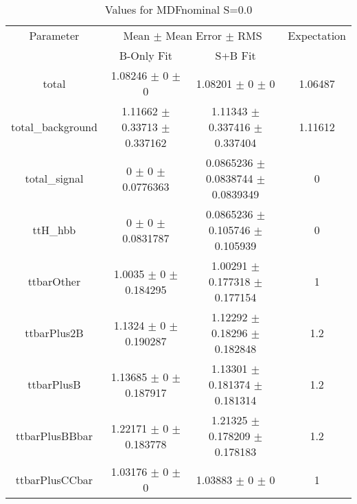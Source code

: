 \begin{table}
\centering
\caption{Values for MDFnominal S=0.0}
\begin{tabular}{cccc}
\toprule
Parameter & \multicolumn{2}{c}{Mean $\pm$ Mean Error $\pm$ RMS} & Expectation\\
 & B-Only Fit & S+B Fit & \\
\midrule
total & \num{1.08246} $\pm$ \num{0} $\pm$ \num{0} & \num{1.08201} $\pm$ \num{0} $\pm$ \num{0} & \num{1.06487}\\
total\_background & \num{1.11662} $\pm$ \num{0.33713} $\pm$ \num{0.337162} & \num{1.11343} $\pm$ \num{0.337416} $\pm$ \num{0.337404} & \num{1.11612}\\
total\_signal & \num{0} $\pm$ \num{0} $\pm$ \num{0.0776363} & \num{0.0865236} $\pm$ \num{0.0838744} $\pm$ \num{0.0839349} & \num{0}\\
ttH\_hbb & \num{0} $\pm$ \num{0} $\pm$ \num{0.0831787} & \num{0.0865236} $\pm$ \num{0.105746} $\pm$ \num{0.105939} & \num{0}\\
ttbarOther & \num{1.0035} $\pm$ \num{0} $\pm$ \num{0.184295} & \num{1.00291} $\pm$ \num{0.177318} $\pm$ \num{0.177154} & \num{1}\\
ttbarPlus2B & \num{1.1324} $\pm$ \num{0} $\pm$ \num{0.190287} & \num{1.12292} $\pm$ \num{0.18296} $\pm$ \num{0.182848} & \num{1.2}\\
ttbarPlusB & \num{1.13685} $\pm$ \num{0} $\pm$ \num{0.187917} & \num{1.13301} $\pm$ \num{0.181374} $\pm$ \num{0.181314} & \num{1.2}\\
ttbarPlusBBbar & \num{1.22171} $\pm$ \num{0} $\pm$ \num{0.183778} & \num{1.21325} $\pm$ \num{0.178209} $\pm$ \num{0.178183} & \num{1.2}\\
ttbarPlusCCbar & \num{1.03176} $\pm$ \num{0} $\pm$ \num{0} & \num{1.03883} $\pm$ \num{0} $\pm$ \num{0} & \num{1}\\
\bottomrule
\end{tabular}
\end{table}
